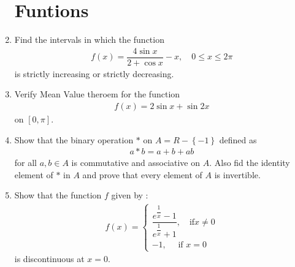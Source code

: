 \documentclass[12pt,-letter paper]{article}
\theoremstyle{remark}
\providecommand{\sbrak}[1]{\ensuremath{{}\left[#1\right]}}
\providecommand{\brak}[1]{\ensuremath{\left(#1\right)}}
\providecommand{\cbrak}[1]{\ensuremath{\left\{#1\right\}}}
\begin{document}
\begin{enumerate}
            \section{Funtions}
      \item Find the intervals in which the function
            \begin{align*}
                  f\brak{x}= \dfrac{4\sin x}{2+\cos x} -x,\quad 0 \leq x \leq 2\pi
            \end{align*}
            is strictly increasing or strictly decreasing.
      \item Verify Mean Value theroem for the function
            \begin{align*}
                  f\brak{x}= 2\sin x + \sin 2x
            \end{align*}
            on $\sbrak{0,\pi}$.
      \item Show that the binary operation $*$ on $ A=R -\cbrak{-1}$ defined as
            \begin{align*}
                  a*b= a+b+ab
            \end{align*}
            for all $a,b \in A$ is commutative and associative on $A$. Also fid the identity element of $*$ in $A$ and prove that every element of $A$ is invertible.\item Show that the function $f$ given by :
            \begin{align*}
                  f\brak{x} = \begin{cases}
                                    \dfrac{e^{\dfrac{1}{x}}-1}{e^{\dfrac{1}{x}}+1} ,\quad \text{if} x\neq 0 \\
                                    -1,\quad \text{ if } x=0
                              \end{cases}
            \end{align*}
            is discontinuous at $x=0$.

\end{enumerate}
\end{document}
